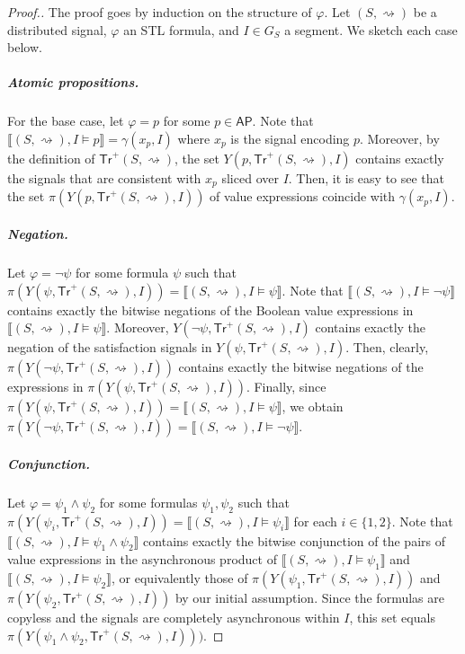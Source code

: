 \documentclass[iicol,lineno]{sn-jnl}
\newcommand{\hb}{\rightsquigarrow}
\newcommand{\tr}{\mathsf{Tr}}
\newcommand{\AP}{\mathsf{AP}}
\newcommand{\?}{\text{?}}
\begin{document}
	\begin{proof}[\normalsize Proof.]
		\normalsize
		The proof goes by induction on the structure of $\varphi$.
		Let $(S,{\hb})$ be a distributed signal, $\varphi$ an STL formula, and $I \in G_S$ a segment.
		We sketch each case below.
		
		\subparagraph*{Atomic propositions.}
		For the base case, let $\varphi = p$ for some $p \in \AP$.
		Note that $\llbracket (S, {\hb}), I \models p \rrbracket = \gamma(x_p, I)$ where $x_p$ is the signal encoding $p$.
		Moreover, by the definition of $\tr^+(S,{\hb})$, the set $Y(p, \tr^+(S,{\hb}), I)$ contains exactly the signals that are consistent with $x_p$ sliced over $I$.
		Then, it is easy to see that the set $\pi(Y(p, \tr^+(S,{\hb}), I))$ of value expressions coincide with $\gamma(x_p, I)$.
		
		\subparagraph*{Negation.}
		Let $\varphi = \lnot \psi$ for some formula $\psi$ such that $\pi(Y(\psi, \tr^+(S,{\hb}), I)) = \llbracket (S,{\hb}), I \models \psi \rrbracket$.
		Note that $\llbracket (S,{\hb}), I \models \lnot \psi \rrbracket$ contains exactly the bitwise negations of the Boolean value expressions in $\llbracket (S,{\hb}), I \models \psi \rrbracket$.
		Moreover, $Y(\lnot\psi, \tr^+(S,{\hb}), I)$ contains exactly the negation of the satisfaction signals in $Y(\psi, \tr^+(S,{\hb}), I)$.
		Then, clearly, $\pi(Y(\lnot\psi, \tr^+(S,{\hb}), I))$ contains exactly the bitwise negations of the expressions in $\pi(Y(\psi, \tr^+(S,{\hb}), I))$.
		Finally, since $\pi(Y(\psi, \tr^+(S,{\hb}), I)) = \llbracket (S,{\hb}), I \models \psi \rrbracket$, we obtain $\pi(Y(\lnot\psi, \tr^+(S,{\hb}), I)) = \llbracket (S,{\hb}), I \models \lnot\psi \rrbracket$.
		
		\subparagraph*{Conjunction.}
		Let $\varphi = \psi_1 \land \psi_2$ for some formulas $\psi_1, \psi_2$ such that $\pi(Y(\psi_i, \tr^+(S,{\hb}), I)) = \llbracket (S,{\hb}), I \models \psi_i \rrbracket$ for each $i \in \{1,2\}$.
		Note that $\llbracket (S,{\hb}), I \models \psi_1 \land \psi_2 \rrbracket$ contains exactly the bitwise conjunction of the pairs of value expressions in the asynchronous product of $\llbracket (S,{\hb}), I \models \psi_1 \rrbracket$ and $\llbracket (S,{\hb}), I \models \psi_2 \rrbracket$, or equivalently those of $\pi(Y(\psi_1, \tr^+(S,{\hb}), I))$ and $\pi(Y(\psi_2, \tr^+(S,{\hb}), I))$ by our initial assumption.
		Since the formulas are copyless and the signals are completely asynchronous within $I$, this set equals $\pi(Y(\psi_1 \land \psi_2, \tr^+(S,{\hb}), I)))$.
		

\end{proof}
\end{document}
